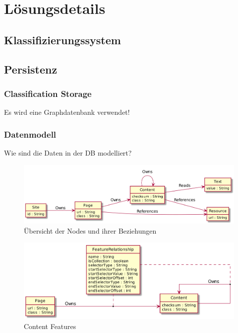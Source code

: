\chapter{Lösungsdetails}
    \label{chapter:SolutionDetails}


    

    \section{Klassifizierungssystem}
    \section{Persistenz}
        \subsection{Classification Storage}
            Es wird eine Graphdatenbank verwendet!
        
        \subsection{Datenmodell}
            Wie sind die Daten in der DB modelliert?
        
            \begin{figure}
                \centering
                \includegraphics[width=\textwidth]{../resources/db-data-model/nodes.png}
                \caption{Übersicht der Nodes und ihrer Beziehungen}
                \label{image:dbDataModelOverview}
            \end{figure}

            \begin{figure}
                \centering
                \includegraphics[width=\textwidth]{../resources/db-data-model/content-relationship.png}
                \caption{Content Features}
                \label{image:dbDataModelContentRelationship}
            \end{figure}

